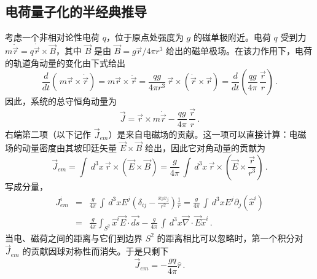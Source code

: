\subsection{电荷量子化的半经典推导}

考虑一个非相对论性电荷 $q$，位于原点处强度为 $g$ 的磁单极附近。电荷 $q$ 受到力 $m\ddot{\vec{r}}=q\dot{\vec{r}}\times\vec{B}$，其中 $\vec{B}$ 是由 $\vec{B}= 
g\vec{r}/4\pi r^3$ 给出的磁单极场。在该力作用下，电荷的轨道角动量的变化由下式给出
$$
\frac{d}{dt}\left(\,m\vec{r}\times\dot{\vec{r}}\right) =
m\vec{r}\times\ddot{\vec{r}}= \frac{qg}{4 \pi r^{3}}\,
\vec{r}\times\left(\dot{\vec{r}}\times\vec{r}\right)= 
\frac{d}{dt}\left(\frac{qg}{4\pi}\,\frac{\vec{r}}{r}\right)\,.
$$
因此，系统的总守恒角动量为
\begin{equation}
\vec{J}=\vec{r}\times m\dot{\vec{r}}-\frac{qg}{4\pi}\,
\frac{\vec{r}}{r}\,.
\label{XI}
\end{equation}
右端第二项（以下记作 $\vec{J}_{em}$）是来自电磁场的贡献。这一项可以直接计算：电磁场的动量密度由其坡印廷矢量 $\vec{E}\times\vec{B}$ 给出，因此它对角动量的贡献为
$$
\vec{J}_{em} = \int \, d^{3}x \, \vec{r} \times
(\vec{E} \times \vec{B}) = \frac{g}{4 \pi} \,
\int \, d^{3} x \, \vec{r} \times
\left( \vec{E} \times \frac{\vec{r}}{r^{3}} \right)\,.
$$
写成分量，
\begin{eqnarray}
J^i_{em} & = & \frac{g}{4 \pi} \, \int \, d^{3}x E^{j}
\left( \delta_{ij} - \frac{x_i x_j}{r^{2}} \right )
\frac{1}{r} = \frac{g}{4 \pi} \, \int \, d^{3}x E^{j}
\partial_{j} (\hat{x}^{i}) \nonumber \\
& = & \frac{g}{4 \pi} \int_{S^2} \hat{x}^i \vec{E}\cdot \vec{ds} 
- \frac{g}{4 \pi} \, \int \, d^{3}x \vec{\nabla} \cdot
\vec{E} \hat{x}^{i}\,. 
\label{XIV}
\end{eqnarray}
当电、磁荷之间的距离与它们到边界 $S^2$ 的距离相比可以忽略时，第一个积分对 $\vec{J}_{em}$ 的贡献因球对称性而消失。于是只剩下
\begin{equation}
\vec{J}_{em}= -\frac{gq}{4 \pi} \hat{r}
\label{Jem}\,.
\end{equation}


